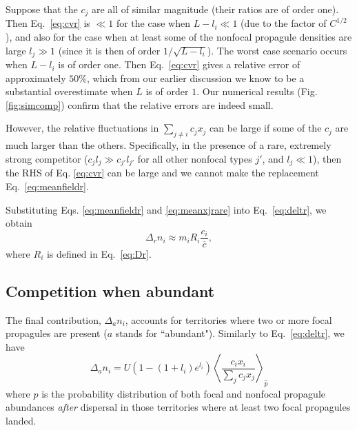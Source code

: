 \documentclass[12pt]{article}
\begin{document}
Suppose that the $c_j$ are all of similar magnitude (their ratios are of order one). Then Eq.~\eqref{eq:cvr} is $\ll 1$ for the case when $L-l_i \ll 1$ (due to the factor of $C^{1/2}$), and also for the case when at least some of the nonfocal propagule densities are large $l_j\gg 1$ (since it is then of order $1/\sqrt{L-l_i}$). The worst case scenario occurs when $L-l_i$ is of order one. Then Eq.~\eqref{eq:cvr} gives a relative error of approximately $50\%$, which from our earlier discussion we know to be a substantial overestimate when $L$ is of order $1$. Our numerical results (Fig. \ref{fig:simcomp}) confirm that the relative errors are indeed small.

However, the relative fluctuations in $\sum_{j\neq i} c_j x_j$ can be large if some of the $c_j$ are much larger than the others. Specifically, in the presence of a rare, extremely strong competitor ($c_j l_j\gg c_{j'} l_{j'}$ for all other nonfocal types $j'$, and $l_j\ll 1$), then the RHS of Eq. \eqref{eq:cvr} can be large and we cannot make the replacement Eq.~\eqref{eq:meanfieldr}. 

Substituting Eqs. \eqref{eq:meanfieldr} and \eqref{eq:meanxjrare} into Eq.~\eqref{eq:deltr}, we obtain
\begin{equation}
\Delta_r n_i\approx m_i R_i\frac{c_i}{\overline{c}}, \label{eq:deltrfinal}
\end{equation}
where $R_i$ is defined in Eq.~\eqref{eq:Dr}.

\subsection*{Competition when abundant}

The final contribution, $\Delta_a n_i$, accounts for territories where two or more focal propagules are present ($a$ stands for ``abundant"). Similarly to Eq.~\eqref{eq:deltr}, we have 
\begin{equation}
\Delta_a n_i=U(1-(1+l_i)e^{l_i})\left\langle \frac{c_i x_i}{\sum_j c_j x_j} \right\rangle_{\hat{p}}\label{eq:delta}
\end{equation}
where $\hat{p}$ is the probability distribution of both focal and nonfocal propagule abundances \textit{after} dispersal in those territories where at least two focal propagules landed. 
\end{document}
